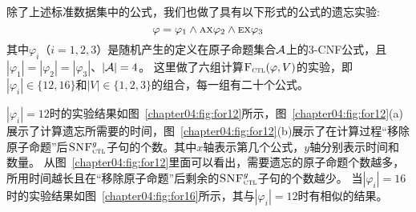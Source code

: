 \begin{table}%
	\centering
	\caption{计算 \emph {ERes}$(\varphi,V)$所使用的CPU时间（单位：秒(s)）}\label{chapter04:tab:sample}
\end{table}

除了上述标准数据集中的公式，我们也做了具有以下形式的公式的遗忘实验:
$$\varphi=\varphi_1 \wedge \textsc{a}\textsc{x} \varphi_2 \wedge \textsc{e}\textsc{x} \varphi_3$$
其中$\varphi_i$（$i=1,2,3$）是随机产生的定义在原子命题集合${\cal A}$上的3-CNF公式，且$|\varphi_1| = |\varphi_2| =|\varphi_3|$、$|{\cal A}|=4$。
这里做了六组计算${\textsc{F}_{\textsc{ctl}}}(\varphi,V)$的实验，即$|\varphi_i| \in \{12,16\}$和$|V|\in \{1,2,3\}$的组合，每一组有二十个公式。

$|\varphi_i|=12$时的实验结果如图~\ref{chapter04:fig:for12}所示，图~\ref{chapter04:fig:for12}(a) 展示了计算遗忘所需要的时间，图~\ref{chapter04:fig:for12}(b)展示了在计算过程“移除原子命题”后${\textsc{SNF}_{\textsc{ctl}}^g}$子句的个数。其中$x$轴表示第几个公式，$y$轴分别表示时间和数量。
从图~\ref{chapter04:fig:for12}里面可以看出，需要遗忘的原子命题个数越多，所用时间越长且在“移除原子命题”后剩余的${\textsc{SNF}_{\textsc{ctl}}^g}$子句的个数越少。
当$|\varphi_i|=16$时的实验结果如图~\ref{chapter04:fig:for16}所示，其与$|\varphi_i|=12$时有相似的结果。

\begin{figure*}[!htb]
	\centering
	\caption{$\varphi_i=12$时的计算结果}
	\label{chapter04:fig:for12}
\end{figure*}


